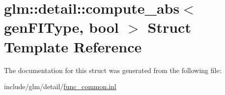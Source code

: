 \hypertarget{structglm_1_1detail_1_1compute__abs}{}\section{glm\+:\+:detail\+:\+:compute\+\_\+abs$<$ gen\+F\+I\+Type, bool $>$ Struct Template Reference}
\label{structglm_1_1detail_1_1compute__abs}


The documentation for this struct was generated from the following file\+:\begin{DoxyCompactItemize}
\item 
include/glm/detail/\hyperlink{func__common_8inl}{func\+\_\+common.\+inl}\end{DoxyCompactItemize}
